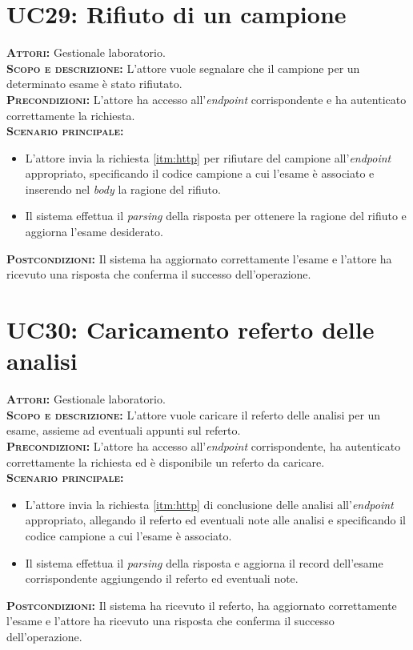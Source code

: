 \section{UC29: Rifiuto di un campione}
\label{sec:UC29}
\textsc{\textbf{Attori:}} Gestionale laboratorio.\\
\textsc{\textbf{Scopo e descrizione:}} L'attore vuole segnalare che il campione per un determinato esame è stato rifiutato.\\
\textsc{\textsc{\textbf{Precondizioni:}}} L'attore ha accesso all'\textit{endpoint} corrispondente e ha autenticato correttamente la richiesta.\\
\textsc{\textbf{Scenario principale:}}  
\begin{itemize}
    \item L'attore invia la richiesta \ref{itm:http} per rifiutare del campione all'\textit{endpoint} appropriato, specificando il codice campione a cui l'esame è associato e inserendo nel \textit{body} la ragione del rifiuto.
    \item Il sistema effettua il \textit{parsing} della risposta per ottenere la ragione del rifiuto e aggiorna l'esame desiderato.
\end{itemize}
\textsc{\textbf{Postcondizioni:}} Il sistema ha aggiornato correttamente l'esame e l'attore ha ricevuto una risposta che conferma il successo dell'operazione.

\section{UC30: Caricamento referto delle analisi}
\label{sec:UC30}
\textsc{\textbf{Attori:}} Gestionale laboratorio.\\
\textsc{\textbf{Scopo e descrizione:}} L'attore vuole caricare il referto delle analisi per un esame, assieme ad eventuali appunti sul referto.\\
\textsc{\textsc{\textbf{Precondizioni:}}} L'attore ha accesso all'\textit{endpoint} corrispondente, ha autenticato correttamente la richiesta ed è disponibile un referto da caricare.\\
\textsc{\textbf{Scenario principale:}}  \begin{itemize}
    \item L'attore invia la richiesta \ref{itm:http} di conclusione delle analisi all'\textit{endpoint} appropriato, allegando il referto ed eventuali note alle analisi e specificando il codice campione a cui l'esame è associato.
    \item Il sistema effettua il \textit{parsing} della risposta e aggiorna il record dell'esame corrispondente aggiungendo il referto ed eventuali note.
\end{itemize}
\textsc{\textbf{Postcondizioni:}} Il sistema ha ricevuto il referto, ha aggiornato correttamente l'esame e l'attore ha ricevuto una risposta che conferma il successo dell'operazione.

